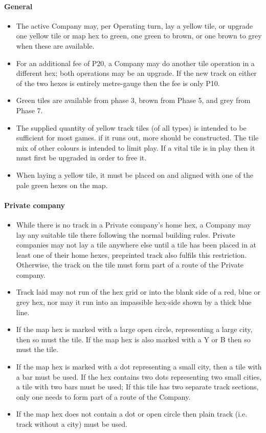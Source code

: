 \documentclass[a4paper,twocolumn]{article}
\begin{document}
\paragraph{General}
\begin{itemize}
	\item The active Company may, per Operating turn, lay a yellow tile, or
	upgrade one yellow tile or map hex to green, one green to brown, or one
	brown to grey when these are available.
	\item For an additional fee of P20, a Company may do another tile operation
	in a different hex; both operations may be an upgrade. If the new track on
	either of the two hexes is entirely metre-gauge then the fee is only P10.
	\item Green tiles are available from phase 3, brown from Phase 5, and grey
	from Phase 7.
	\item The supplied quantity of yellow track tiles (of all types) is intended
	to be sufficient for most games. if it runs out, more should be
	constructed. The tile mix of other colours is intended to limit play. If a
	vital tile is in play then it must first be upgraded in order to free it.
	\item When laying a yellow tile, it must be placed on and aligned with one
	of the pale green hexes on the map.
\end{itemize}

\paragraph{Private company}
\begin{itemize}
	\item While there is no track in a Private company's home hex, a Company may
	lay any suitable tile there following the normal building rules. Private
	companies may not lay a tile anywhere else until a tile has been placed	in
	at least one of their home hexes, preprinted track also fulfils this
	restriction. Otherwise, the track on the tile must form part of a route of
	the Private company.
	\item Track laid may not run of the hex grid or into the blank side of a
	red, blue or grey hex, nor may it run into an impassible hex-side shown by a
	thick blue line.
	\item If the map hex is marked with a large open circle, representing a
	large city, then so must the tile. If the map hex is also marked with a Y or
	B then so must the tile.
	\item If the map hex is marked with a dot representing a small city, then a
	tile with a bar must be used. If the hex contains two dots representing two
	small cities, a tile with two bars must be used; If this tile has two
	separate track sections, only one needs to form part of a route of the
	Company.
	\item If the map hex does not contain a dot or open circle then plain track
	(i.e. track without a city) must be used.
\end{itemize}
\end{document}
